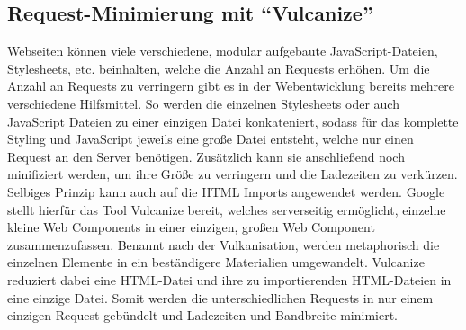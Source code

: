 \subsection{\texorpdfstring{Request-Minimierung mit ``Vulcanize''}{Request-Minimierung mit Vulcanize}}\label{request-minimierung-mit-vulcanize}

Webseiten können viele verschiedene, modular aufgebaute JavaScript-Dateien, Stylesheets, etc. beinhalten, welche die Anzahl an Requests erhöhen. Um die Anzahl an Requests zu verringern gibt es in der Webentwicklung bereits mehrere verschiedene Hilfsmittel. So werden die einzelnen Stylesheets oder auch JavaScript Dateien zu einer einzigen Datei konkateniert, sodass für das komplette Styling und JavaScript jeweils eine große Datei entsteht, welche nur einen Request an den Server benötigen. Zusätzlich kann sie anschließend noch minifiziert werden, um ihre Größe zu verringern und die Ladezeiten zu verkürzen. Selbiges Prinzip kann auch auf die \ac{HTML} Imports angewendet werden. Google stellt hierfür das Tool Vulcanize \cite{citeulike:13879681} bereit, welches serverseitig ermöglicht, einzelne kleine Web Components in einer einzigen, großen Web Component zusammenzufassen. Benannt nach der Vulkanisation, werden metaphorisch die einzelnen Elemente in ein beständigere Materialien umgewandelt. Vulcanize reduziert dabei eine \ac{HTML}-Datei und ihre zu importierenden \ac{HTML}-Dateien in eine einzige Datei. Somit werden die unterschiedlichen Requests in nur einem einzigen Request gebündelt und Ladezeiten und Bandbreite minimiert.

